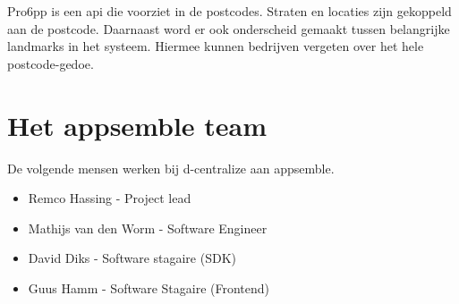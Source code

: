 Pro6pp is een api die voorziet in de postcodes. Straten en locaties zijn gekoppeld aan de postcode. Daarnaast word er ook onderscheid gemaakt tussen belangrijke landmarks in het systeem. Hiermee kunnen bedrijven vergeten over het hele postcode-gedoe.

\section{Het appsemble team}

De volgende mensen werken bij d-centralize aan appsemble.

\begin{itemize}
	\item Remco Hassing			- Project lead
	\item Mathijs van den Worm	- Software Engineer
	\item David Diks			- Software stagaire (SDK)
	\item Guus Hamm				- Software Stagaire (Frontend)
\end{itemize}